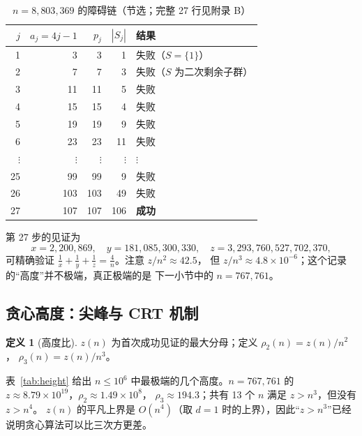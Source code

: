 \documentclass[11pt,a4paper]{ctexart}
\theoremstyle{definition}
\newtheorem{definition}[theorem]{定义}
\theoremstyle{remark}
\begin{document}
\begin{table}[H]
\centering
\caption{$n=8{,}803{,}369$ 的障碍链（节选；完整 27 行见附录 B）}
\label{tab:chain}
\small
\begin{tabular}{@{}rrrrl@{}}
\toprule
$j$ & $a_j=4j-1$ & $p_j$ & $|S_j|$ & 结果 \\
\midrule
1 & 3 & 3 & 1 & 失败（$S=\{1\}$）\\
2 & 7 & 7 & 3 & 失败（$S$ 为二次剩余子群）\\
3 & 11 & 11 & 5 & 失败 \\
4 & 15 & 15 & 4 & 失败 \\
5 & 19 & 19 & 9 & 失败 \\
6 & 23 & 23 & 11 & 失败 \\
$\vdots$ & $\vdots$ & $\vdots$ & $\vdots$ & $\vdots$ \\
25 & 99 & 99 & 9 & 失败 \\
26 & 103 & 103 & 49 & 失败 \\
27 & 107 & 107 & 106 & \textbf{成功} \\
\bottomrule
\end{tabular}
\end{table}

第 27 步的见证为
\[
x=2{,}200{,}869,\quad
y=181{,}085{,}300{,}330,\quad
z=3{,}293{,}760{,}527{,}702{,}370,
\]
可精确验证 $\frac1x+\frac1y+\frac1z=\frac4n$。注意 $z/n^2\approx42.5$，
但 $z/n^3\approx4.8\times10^{-6}$；这个记录的“高度”并不极端，真正极端的是
下一小节中的 $n=767{,}761$。

\subsection{贪心高度：尖峰与 CRT 机制}

\begin{definition}[高度比]
$z(n)$ 为首次成功见证的最大分母；定义 $\rho_2(n)=z(n)/n^2$，
$\rho_3(n)=z(n)/n^3$。
\end{definition}

表~\ref{tab:height} 给出 $n\le10^6$ 中最极端的几个高度。$n=767{,}761$ 的
$z\approx8.79\times10^{19}$，$\rho_2\approx1.49\times10^8$，
$\rho_3\approx194.3$；共有 13 个 $n$ 满足 $z>n^3$，但没有 $z>n^4$。
$z(n)$ 的平凡上界是 $O(n^4)$（取 $d=1$ 时的上界），因此“$z>n^3$”已经
说明贪心算法可以比三次方更差。
\end{document}
